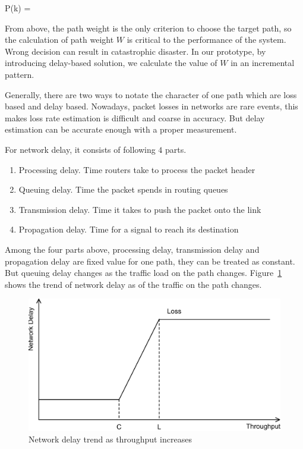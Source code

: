 \be
\label{eq.choose}
P(k) = 
\ee

From above, the path weight is the only criterion to choose the target path, so the calculation of path weight $W$ is critical to the performance of the system. Wrong decision can result in catastrophic disaster. In our prototype, by introducing delay-based solution, we calculate the value of $W$ in an incremental pattern.

Generally, there are two ways to notate the character of one path which are loss based and delay based. Nowadays, packet losses in networks are rare events, this makes loss rate estimation is difficult and coarse in accuracy. But delay estimation can be accurate enough with a proper measurement.

For network delay, it consists of following $4$ parts.

\begin{enumerate}
\item Processing delay. Time routers take to process the packet header
\item Queuing delay. Time the packet spends in routing queues
\item Transmission delay. Time it takes to push the packet onto the link
\item Propagation delay. Time for a signal to reach its destination
\end{enumerate}

Among the four parts above, processing delay, transmission delay and propagation delay are fixed value for one path, they can be treated as constant. But queuing delay changes as the traffic load on the path changes. Figure~\ref{fig.delay} shows the trend of network delay as of the traffic on the path changes.

\begin{figure}
\centering
\includegraphics[width=0.8\linewidth]{fig/delay.eps}
\caption{Network delay trend as throughput increases}
\label{fig.delay}
\end{figure}

